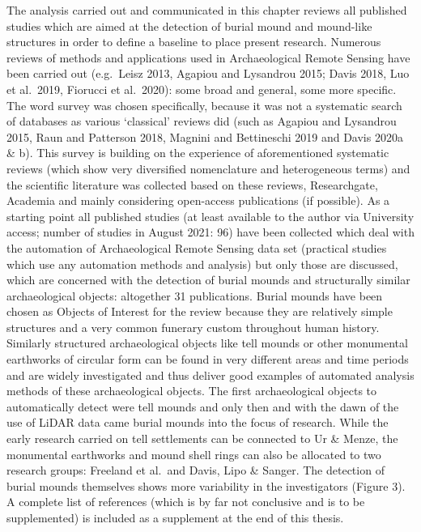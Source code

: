 \documentclass[
]{article}
\begin{document}
The analysis carried out and communicated in this chapter reviews all published studies which are aimed at the detection of burial mound and mound-like structures in order to define a baseline to place present research. Numerous reviews of methods and applications used in Archaeological Remote Sensing have been carried out (e.g.~Leisz 2013, Agapiou and Lysandrou 2015; Davis 2018, Luo et al.~2019, Fiorucci et al.~2020): some broad and general, some more specific. The word survey was chosen specifically, because it was not a systematic search of databases as various `classical' reviews did (such as Agapiou and Lysandrou 2015, Raun and Patterson 2018, Magnini and Bettineschi 2019 and Davis 2020a \& b).
This survey is building on the experience of aforementioned systematic reviews (which show very diversified nomenclature and heterogeneous terms) and the scientific literature was collected based on these reviews, Researchgate, Academia and mainly considering open-access publications (if possible). As a starting point all published studies (at least available to the author via University access; number of studies in August 2021: 96) have been collected which deal with the automation of Archaeological Remote Sensing data set (practical studies which use any automation methods and analysis) but only those are discussed, which are concerned with the detection of burial mounds and structurally similar archaeological objects: altogether 31 publications. Burial mounds have been chosen as Objects of Interest for the review because they are relatively simple structures and a very common funerary custom throughout human history. Similarly structured archaeological objects like tell mounds or other monumental earthworks of circular form can be found in very different areas and time periods and are widely investigated and thus deliver good examples of automated analysis methods of these archaeological objects. The first archaeological objects to automatically detect were tell mounds and only then and with the dawn of the use of LiDAR data came burial mounds into the focus of research. While the early research carried on tell settlements can be connected to Ur \& Menze, the monumental earthworks and mound shell rings can also be allocated to two research groups: Freeland et al.~and Davis, Lipo \& Sanger. The detection of burial mounds themselves shows more variability in the investigators (Figure 3). A complete list of references (which is by far not conclusive and is to be supplemented) is included as a supplement at the end of this thesis.
\end{document}
